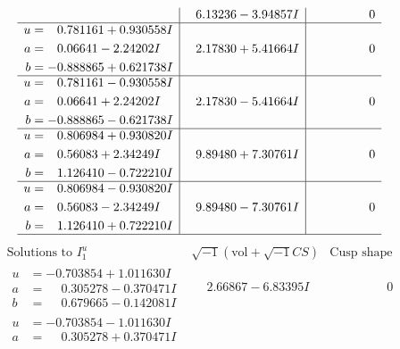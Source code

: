 \documentclass[1p]{elsarticle_modified}
\theoremstyle{definition}
\newcommand{\I}{\sqrt{-1}}
\begin{document}
$$\begin{array}{c|c|c}
 & \phantom{-}6.13236 - 3.94857 I & \phantom{-0.000000 } 0 \\ \hline\begin{aligned}
u &= \phantom{-}0.781161 + 0.930558 I \\
a &= \phantom{-}0.06641 - 2.24202 I \\
b &= -0.888865 + 0.621738 I\end{aligned}
 & \phantom{-}2.17830 + 5.41664 I & \phantom{-0.000000 } 0 \\ \hline\begin{aligned}
u &= \phantom{-}0.781161 - 0.930558 I \\
a &= \phantom{-}0.06641 + 2.24202 I \\
b &= -0.888865 - 0.621738 I\end{aligned}
 & \phantom{-}2.17830 - 5.41664 I & \phantom{-0.000000 } 0 \\ \hline\begin{aligned}
u &= \phantom{-}0.806984 + 0.930820 I \\
a &= \phantom{-}0.56083 + 2.34249 I \\
b &= \phantom{-}1.126410 - 0.722210 I\end{aligned}
 & \phantom{-}9.89480 + 7.30761 I & \phantom{-0.000000 } 0 \\ \hline\begin{aligned}
u &= \phantom{-}0.806984 - 0.930820 I \\
a &= \phantom{-}0.56083 - 2.34249 I \\
b &= \phantom{-}1.126410 + 0.722210 I\end{aligned}
 & \phantom{-}9.89480 - 7.30761 I & \phantom{-0.000000 } 0\\
 \hline 
 \end{array}$$\newpage$$\begin{array}{c|c|c}  
\text{Solutions to }I^u_{1}& \I (\text{vol} + \sqrt{-1}CS) & \text{Cusp shape}\\
 \hline 
\begin{aligned}
u &= -0.703854 + 1.011630 I \\
a &= \phantom{-}0.305278 - 0.370471 I \\
b &= \phantom{-}0.679665 - 0.142081 I\end{aligned}
 & \phantom{-}2.66867 - 6.83395 I & \phantom{-0.000000 } 0 \\ \hline\begin{aligned}
u &= -0.703854 - 1.011630 I \\
a &= \phantom{-}0.305278 + 0.370471 I \\

\end{aligned}
\end{array}$$
\end{document}
